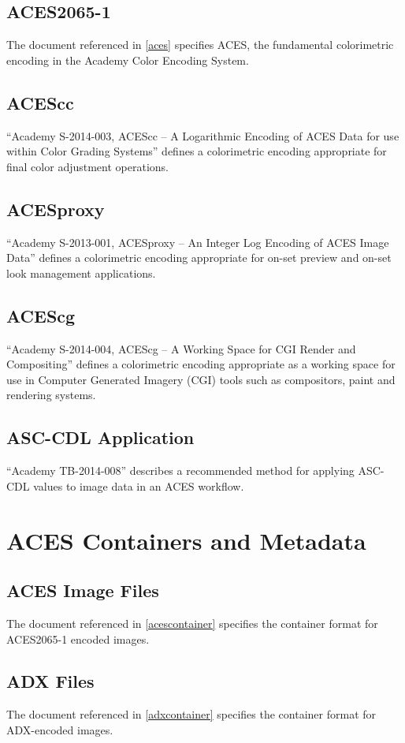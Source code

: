 \subsection{ACES2065-1}
The document referenced in \autoref{aces} specifies ACES, the fundamental colorimetric encoding in the Academy Color Encoding System.

\subsection{ACEScc}
``Academy S-2014-003, ACEScc -- A Logarithmic Encoding of ACES Data for use within Color Grading Systems'' defines a colorimetric encoding appropriate for final color adjustment operations.

\subsection{ACESproxy}
``Academy S-2013-001, ACESproxy -- An Integer Log Encoding of ACES Image Data'' defines a colorimetric encoding appropriate for on-set preview and on-set look management applications.

\subsection{ACEScg}
``Academy S-2014-004, ACEScg -- A Working Space for CGI Render and Compositing'' defines a colorimetric encoding appropriate as a working space for use in Computer Generated Imagery (CGI) tools such as compositors, paint and rendering systems.

\subsection{ASC-CDL Application}
``Academy TB-2014-008'' describes a recommended method for applying ASC-CDL values to image data in an ACES workflow.


\section{ACES Containers and Metadata}
\subsection{ACES Image Files}
The document referenced in \autoref{acescontainer} specifies the container format for ACES2065-1 encoded images.

\subsection{ADX Files}
The document referenced in \autoref{adxcontainer} specifies the container format for ADX-encoded images.

